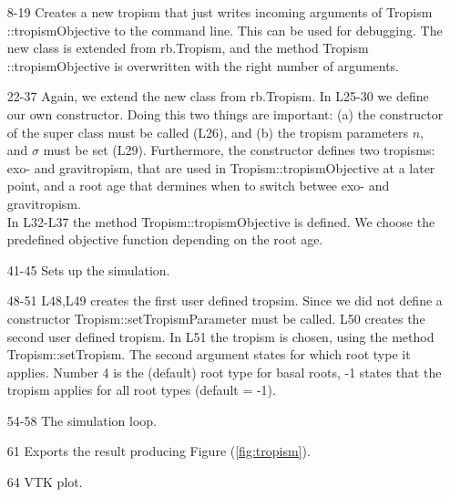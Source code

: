 \begin{itemize}

\item[8-19] Creates a new tropism that just writes incoming arguments of Tropism ::tropismObjective to the command line. This can be used for debugging. The new class is extended from rb.Tropism, and the method Tropism ::tropismObjective is overwritten with the right number of arguments.

\item[22-37] Again, we extend the new class from rb.Tropism. In L25-30 we define our own constructor. Doing this two things are important: (a) the constructor of the super class must be called (L26), and (b) the tropism parameters $n$, and $\sigma$ must be set (L29). 
Furthermore, the constructor defines two tropisms: exo- and gravitropism, that are used in Tropism::tropismObjective at a later point, and a root age that dermines when to switch betwee exo- and gravitropism. \\
In L32-L37 the method Tropism::tropismObjective is defined. We choose the predefined objective function depending on the root age.

\item[41-45] Sets up the simulation.

\item[48-51] L48,L49 creates the first user defined tropsim. Since we did not define a constructor Tropism::setTropismParameter must be called. L50 creates the second user defined tropism.  In L51 the tropism is chosen, using the method Tropism::setTropism. The second argument states for which root type it applies. 
Number 4 is the (default) root type for basal roots, -1 states that the tropism applies for all root types (default = -1).

\item[54-58] The simulation loop. 

\item [61] Exports the result producing Figure (\ref{fig:tropism}). 

\item [64] VTK plot.

\end{itemize}





